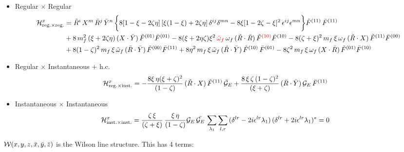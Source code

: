 \documentclass[9pt]{article}
\newcommand{\chg}[1]{{\color{red}#1}}
\numberwithin{equation}{section}
\begin{document}
\begin{itemize}
    \item Regular $\times$ Regular
    \begin{align}
    \mathcal{H}^{x}_{\mathrm{reg.}\times \mathrm{reg.}} & = \Tilde{R}^{i}\,X^{m}\,\Bar{R}^{j}\,\Bar{Y}^{n}\,\bigg\{8[1-\xi-2\zeta\eta]\,[\xi(1-\xi) + 2\zeta\eta]\,\delta^{ij}\delta^{mn}-8\xi[1-2\zeta-\xi]^{2}\,\epsilon^{ij}\epsilon^{mn}\bigg\}\Tilde{F}^{(11)}\,\Bar{F}^{(11)}\notag \\ & +8\,m^{2}_{f}\,(\xi +2\zeta\eta)\, (X\cdot \Bar{Y})\,\Tilde{F}^{(01)}\Bar{F}^{(01)} - 8(\xi + 2\eta\zeta)\xi^{2}\,\chg{\Tilde{\omega}_{f}}\,\omega_{f}\,(\Tilde{R}\cdot\Bar{R})\,\Tilde{F}^{\chg{(10)}}\Bar{F}^{(10)} - 8(\zeta + \xi)^{2}\,m_{f}\,\xi\,\omega_{f}\,(\Tilde{R}\cdot X)\,\Tilde{F}^{(11)}\Bar{F}^{(00)}\notag \\ & + 8(1-\zeta)^{2}\,m_{f}\,\xi\,\Tilde{\omega}_{f}\,(\Bar{R}\cdot \Bar{Y})\,\Tilde{F}^{(00)}\Bar{F}^{(11)} +8\eta^{2}\,m_{f}\,\xi\, \Tilde{\omega}_{f}\,(\Tilde{R}\cdot \Bar{Y})\,\Tilde{F}^{(10)}\,\Bar{F}^{(01)}-8\zeta^{2}\,m_{f}\,\xi\,\omega_{f}\,(X\cdot \Bar{R})\,\Tilde{F}^{(01)}\Bar{F}^{(10)}
    \label{chg:int}\end{align}
    \item Regular $\times$ Instantaneous $+$ h.c.
    \begin{align}
    \mathcal{H}^{x}_{\mathrm{reg.}\times \mathrm{inst.}} & = -\frac{8\xi\,\eta (\xi +\zeta)^{2}}{(1-\zeta)}\,(\Tilde{R}\cdot X)\,\Tilde{F}^{(11)}\,\Bar{\mathcal{G}}_{E} + \frac{8\,\xi\,\zeta\,(1-\zeta)^{2}}{(\xi + \zeta)}\,(\Bar{R}\cdot \Bar{Y})\,\mathcal{G}_{E}\,\Bar{F}^{(11)}
    \end{align}
\item Instantaneous $\times$ Instantaneous
    \begin{align}
    \mathcal{H}^{x}_{\mathrm{inst.}\times \mathrm{inst.}} & = \frac{\zeta\,\xi}{(\zeta + \xi)}\,\frac{\xi\,\eta}{(1-\zeta)}\mathcal{G}_{E}\,\Bar{\mathcal{G}_{E}}\,\sum_{\lambda_{1}}\sum_{l,r}\,(\delta^{lr}-2i\epsilon^{lr}\lambda_{1})\,(\delta^{lr}+2i\epsilon^{lr}\lambda_{1})^{*} = 0
    \end{align}
\end{itemize}
$\mathcal{W}(x,y,z,\Bar{x},\Bar{y},\Bar{z})$ is the Wilson line structure. This has 4 terms:
\end{document}
